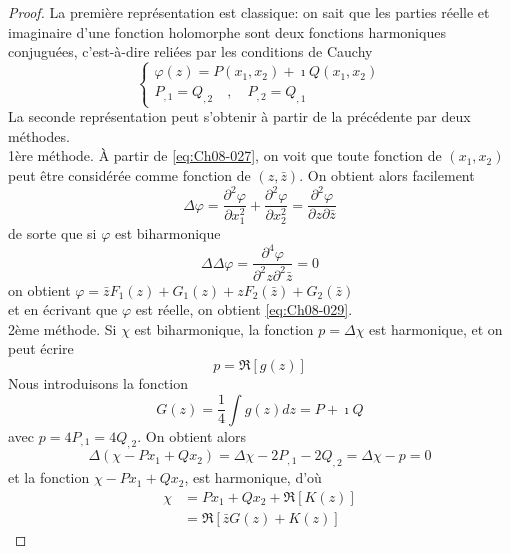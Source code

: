 \begin{proof}
La première représentation est classique: on sait que les parties réelle et imaginaire d'une fonction holomorphe sont deux fonctions harmoniques conjuguées, c'est-à-dire reliées par les conditions de Cauchy 
\begin{equation}
    \begin{cases}
        \varphi(z)=P(x_1,x_2)+\imath Q(x_1,x_2) \\
        P_{,1}=Q_{,2} \quad , \quad P_{,2}=Q_{,1}
    \end{cases}
    \label{eq:Ch08-030}
\end{equation}
La seconde représentation peut s'obtenir à partir de la précédente par deux méthodes. \\
1ère méthode. À partir de \eqref{eq:Ch08-027}, on voit que toute fonction de $(x_1,x_2)$ peut être considérée comme fonction de $(z,\bar{z})$. 
On obtient alors facilement 
\begin{equation*}
  \Delta \varphi = \frac{\partial^2\varphi}{\partial x_1^2} + \frac{\partial^2\varphi}{\partial x_2^2} = \frac{\partial^2\varphi}{\partial z \partial \bar{z}}
\end{equation*}
de sorte que si $\varphi$ est biharmonique
\begin{equation*}
  \Delta\Delta\varphi=\frac{\partial^4\varphi}{\partial^2 z \partial^2 \bar{z}}=0
\end{equation*}
on obtient $\varphi=\bar{z}F_1(z)+G_1(z)+zF_2(\bar{z})+G_2(\bar{z})$ \\
et en écrivant que $\varphi$ est réelle, on obtient \eqref{eq:Ch08-029}.\\
2ème méthode. Si $\chi$ est biharmonique, la fonction $p=\Delta\chi$ est harmonique, et on peut écrire 
\begin{equation*}
    p=\Re \left[ g(z)\right]
\end{equation*}
Nous introduisons la fonction 
\begin{equation*}
    G(z) = \frac{1}{4}\int g(z) dz = P + \imath Q
\end{equation*}
avec $p=4P_{,1}=4Q_{,2}$.
On obtient alors 
\begin{equation*}
    \Delta (\chi - Px_1 + Qx_2) = \Delta\chi - 2P_{,1} - 2Q_{,2} = \Delta\chi - p = 0
\end{equation*}
et la fonction $\chi - Px_1 + Qx_2$, est harmonique, d'où
\begin{equation*}
    \begin{aligned}
        \chi & = Px_1 + Qx_2 + \Re \left[ K(z)\right]\\
             & = \Re \left[ \bar{z}G(z) + K(z) \right]
    \end{aligned}
\end{equation*}
\end{proof}

